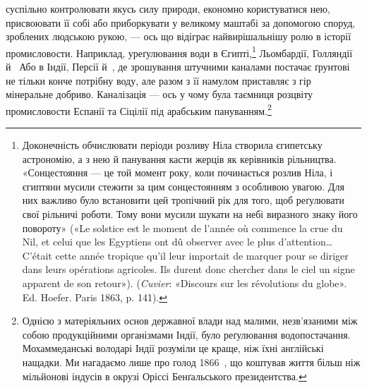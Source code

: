 суспільно контролювати якусь силу природи, економно користуватися
нею, присвоювати її собі або приборкувати у великому
маштабі за допомогою споруд, зроблених людською рукою, —
ось що відіграє найвирішальнішу ролю в історії промисловости.
Наприклад, уреґулювання води в Єгипті,\footnote{
Доконечність обчислювати періоди розливу Ніла створила єгипетську
астрономію, а з нею й панування касти жерців як керівників
рільництва. «Сонцестояння — це той момент року, коли починається
розлив Ніла, і єгиптяни мусили стежити за цим сонцестоянням з особливою
увагою. Для них важливо було встановити цей тропічний рік для
того, щоб реґулювати свої рільничі роботи. Тому вони мусили шукати
на небі виразного знаку його повороту» («Le solstice est le moment de
l’année où commence la crue du Nil, et celui que les Egyptiens ont dû
observer avec le plus d’attention\dots{} C’était cette année tropique qu’il leur
importait de marquer pour se diriger dans leurs opérations agricoles. Ils
durent donc chercher dans le ciel un signe apparent de son retour»). (\emph{Cuvier}:
«Discours sur les révolutions du globe». Ed. Hoefer. Paris 1863, p. 141).
} Льомбардії, Голляндії
й~ Або в Індії, Персії й~, де зрошування штучними
каналами постачає ґрунтові не тільки конче потрібну воду, але
разом з її намулом приставляє з гір мінеральне добриво. Каналізація
— ось у чому була таємниця розцвіту промисловости Еспанії
та Сіцілії під арабським пануванням.\footnote{
Однією з матеріяльних основ державної влади над малими, незв'язаними
між собою продукційними організмами Індії, було реґулювання
водопостачання. Мохаммеданські володарі Індії розуміли це краще,
ніж їхні англійські нащадки. Ми нагадаємо лише про голод 1866~, що
коштував життя більш ніж мільйонові індусів в окрузі Оріссі Бенґальського
президентства.
}

